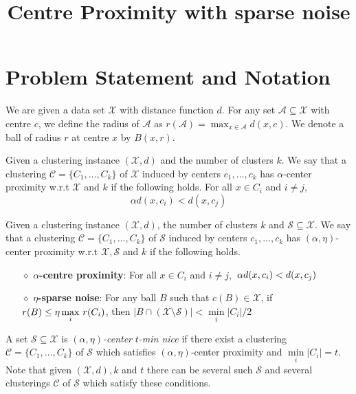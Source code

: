 \documentclass[11pt]{article}
\title{\LARGE Centre Proximity with sparse noise}
\author{}
\newcommand{\mc}{\mathcal}
\begin{document}
\maketitle

\section{Problem Statement and Notation}
We are given a data set $\mc X$ with distance function $d$. For any set $\mc A\subseteq \mc X$ with centre $c$, we define the radius of $\mc A$ as $r(\mc A) = \max_{x \in \mc A} d(x, c)$. We denote a ball of radius $r$ at centre $x$ by $B(x, r)$.

\begin{definition}
\label{defn:alphacp}
Given a clustering instance $(\mc X, d)$ and the number of clusters $k$. We say that a clustering $\mc C = \{C_1, \ldots, C_k\}$ of $\mc X$ induced by centers $c_1, \ldots, c_k$ has $\alpha$-center proximity w.r.t $\mc X$ and $k$ if the following holds. For all $x \in C_i$ and $i\neq j$, 
$$\alpha d(x, c_i) < d(x, c_j)$$
\end{definition}

\begin{definition}
Given a clustering instance $(\mc X, d)$, the number of clusters $k$ and $\mc S \subseteq \mc X$. We say that a clustering $\mc C = \{C_1, \ldots, C_k\}$ of $\mc S$ induced by centers $c_1, \ldots, c_k$ has $(\alpha, \eta)$-center proximity w.r.t $\mc X, \mc S$ and $k$ if the following holds.

\begin{itemize}[nolistsep, noitemsep]
\label{defn:alphacpnoise}	

\item[$\diamond$] {\bf $\alpha$-centre proximity}: For all $x \in C_i$ and $i\neq j$, $\thinspace\alpha d(x, c_i) < d(x, c_j)$
\item[$\diamond$]{\bf $\eta$-sparse noise}: For any ball $B$ such that $c(B)\in \mathcal{X}$, if $r(B)\leq \eta\max\limits_{i} \thinspace r(C_i)$, then $|B\cap (\mc X\setminus \mc S)| < \min\limits_{i} |C_i|/2$
\end{itemize}
\end{definition}

\noindent A set $\mc S \subseteq \mc X$ is {\it $(\alpha, \eta)$-center} {\it $t$-min nice} if there exist a clustering $\mc C=\{C_1,\ldots,C_k\}$ of $\mc S$ which satisfies $(\alpha, \eta)$-center proximity and $\min\limits_{i} \lvert C_i\rvert = t$. Note that given $(\mc X, d), k$ and $t$ there can be several such $\mc S$ and several clusterings $\mc C$ of $\mc S$ which satisfy these conditions.
\end{document}
